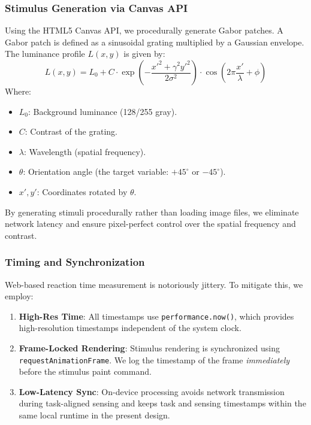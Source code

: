 \documentclass[dvipdfmx]{ehis}
\begin{document}
\subsubsection{Stimulus Generation via Canvas API}
Using the HTML5 Canvas API, we procedurally generate Gabor patches. A Gabor patch is defined as a sinusoidal grating multiplied by a Gaussian envelope.
The luminance profile $L(x,y)$ is given by:
\begin{equation}
    L(x,y) = L_0 + C \cdot \exp\left(-\frac{x'^2 + \gamma^2 y'^2}{2\sigma^2}\right) \cdot \cos\left(2\pi \frac{x'}{\lambda} + \phi\right)
\end{equation}
Where:
\begin{itemize}
    \item $L_0$: Background luminance (128/255 gray).
    \item $C$: Contrast of the grating.
    \item $\lambda$: Wavelength (spatial frequency).
    \item $\theta$: Orientation angle (the target variable: $+45^\circ$ or $-45^\circ$).
    \item $x', y'$: Coordinates rotated by $\theta$.
\end{itemize}
By generating stimuli procedurally rather than loading image files, we eliminate network latency and ensure pixel-perfect control
over the spatial frequency and contrast.

\subsubsection{Timing and Synchronization}
Web-based reaction time measurement is notoriously jittery. To mitigate this, we employ:
\begin{enumerate}
    \item \textbf{High-Res Time}: All timestamps use \texttt{performance.now()}, which provides high-resolution timestamps independent of the system clock.
    \item \textbf{Frame-Locked Rendering}: Stimulus rendering is synchronized using \texttt{requestAnimationFrame}.
    We log the timestamp of the frame \textit{immediately} before the stimulus paint command.
    \item \textbf{Low-Latency Sync}: On-device processing avoids network transmission during task-aligned sensing and keeps task and sensing timestamps within the same local runtime in the present design.
\end{enumerate}
\end{document}
